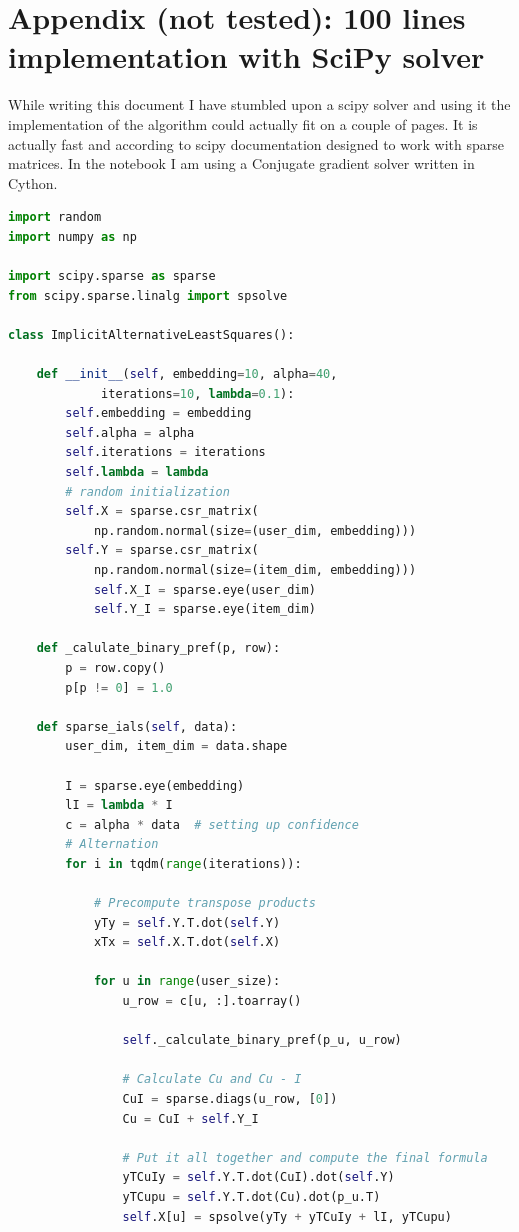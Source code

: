 \documentclass[12pt]{article}
\begin{document}
\section{Appendix (not tested): 100 lines implementation with SciPy solver}
While writing this document I have stumbled upon a scipy solver and using it the implementation of the algorithm could actually fit on a couple of pages. It is actually fast and according to scipy documentation designed to work with sparse matrices. In the notebook I am using a Conjugate gradient solver written in Cython.
\begin{lstlisting}[language=Python]
import random
import numpy as np

import scipy.sparse as sparse
from scipy.sparse.linalg import spsolve

class ImplicitAlternativeLeastSquares():

    def __init__(self, embedding=10, alpha=40,
    		 iterations=10, lambda=0.1):
        self.embedding = embedding
        self.alpha = alpha
        self.iterations = iterations
        self.lambda = lambda
        # random initialization
        self.X = sparse.csr_matrix(
            np.random.normal(size=(user_dim, embedding)))
        self.Y = sparse.csr_matrix(
            np.random.normal(size=(item_dim, embedding)))
            self.X_I = sparse.eye(user_dim)
            self.Y_I = sparse.eye(item_dim)

    def _calulate_binary_pref(p, row):
        p = row.copy()
        p[p != 0] = 1.0

    def sparse_ials(self, data):
        user_dim, item_dim = data.shape

        I = sparse.eye(embedding)
        lI = lambda * I
        c = alpha * data  # setting up confidence
        # Alternation
        for i in tqdm(range(iterations)):

            # Precompute transpose products
            yTy = self.Y.T.dot(self.Y)
            xTx = self.X.T.dot(self.X)

            for u in range(user_size):
                u_row = c[u, :].toarray()

                self._calculate_binary_pref(p_u, u_row)

                # Calculate Cu and Cu - I
                CuI = sparse.diags(u_row, [0])
                Cu = CuI + self.Y_I

                # Put it all together and compute the final formula
                yTCuIy = self.Y.T.dot(CuI).dot(self.Y)
                yTCupu = self.Y.T.dot(Cu).dot(p_u.T)
                self.X[u] = spsolve(yTy + yTCuIy + lI, yTCupu)


\end{lstlisting}
\end{document}
